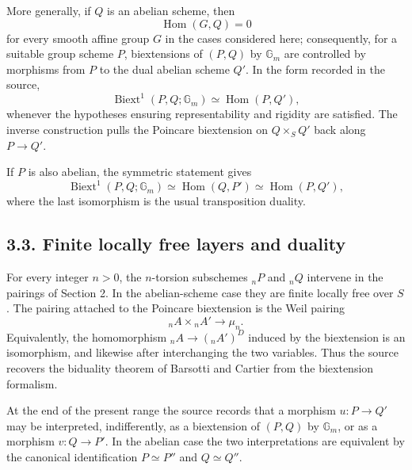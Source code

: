 \documentclass[11pt]{article}
\providecommand{\Gm}{\mathbb G_m}
\providecommand{\Hom}{\operatorname{Hom}}
\providecommand{\Biext}{\operatorname{Biext}}
\begin{document}
More generally, if \(Q\) is an abelian scheme, then
\begin{equation}\tag{3.2.1}
        \Hom(G,Q)=0
\end{equation}
for every smooth affine group \(G\) in the cases considered here; consequently, for a suitable group scheme \(P\), biextensions of \((P,Q)\) by \(\Gm\) are controlled by morphisms from \(P\) to the dual abelian scheme \(Q'\).  In the form recorded in the source,
\begin{equation}\tag{3.2.2}
        \Biext^1(P,Q;\Gm)\simeq \Hom(P,Q'),
\end{equation}
whenever the hypotheses ensuring representability and rigidity are satisfied.  The inverse construction pulls the Poincare biextension on \(Q\times_SQ'\) back along \(P\to Q'\).

If \(P\) is also abelian, the symmetric statement gives
\begin{equation}\tag{3.2.3}
        \Biext^1(P,Q;\Gm)\simeq \Hom(Q,P')
        \simeq \Hom(P,Q'),
\end{equation}
where the last isomorphism is the usual transposition duality.

\subsection*{3.3. Finite locally free layers and duality}

For every integer \(n>0\), the \(n\)-torsion subschemes \({}_nP\) and \({}_nQ\) intervene in the pairings of Section 2.  In the abelian-scheme case they are finite locally free over \(S\).  The pairing attached to the Poincare biextension is the Weil pairing
\begin{equation}\tag{3.3.1}
        {}_nA\times {}_nA'\longrightarrow \mu_n.
\end{equation}
Equivalently, the homomorphism \({}_nA\to({}_nA')^D\) induced by the biextension is an isomorphism, and likewise after interchanging the two variables.  Thus the source recovers the biduality theorem of Barsotti and Cartier from the biextension formalism.

At the end of the present range the source records that a morphism \(u:P\to Q'\) may be interpreted, indifferently, as a biextension of \((P,Q)\) by \(\Gm\), or as a morphism \(v:Q\to P'\).  In the abelian case the two interpretations are equivalent by the canonical identification \(P\simeq P''\) and \(Q\simeq Q''\).
\end{document}
